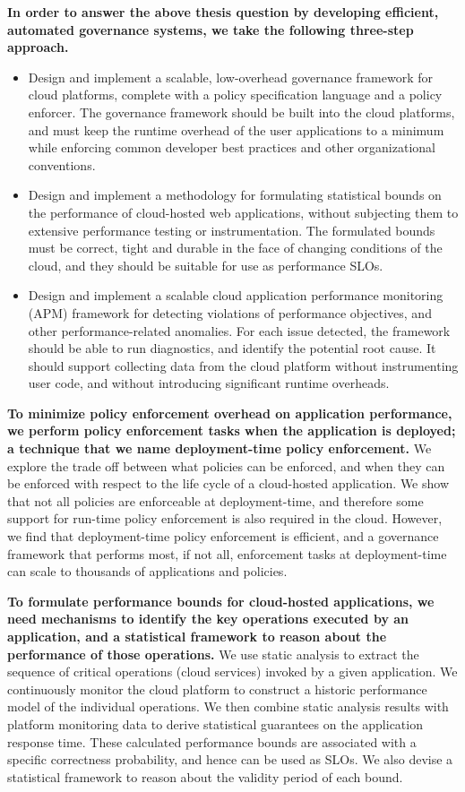 \textbf{In order to answer the above thesis question by developing efficient, automated governance systems,
we take the following three-step approach.}
\begin{itemize}
\item Design and implement a scalable, low-overhead governance framework for cloud platforms,
complete with a policy specification language and a policy enforcer. The governance framework should be
built into the cloud platforms, and must
keep the runtime overhead of the user applications to a minimum while enforcing
common developer best practices and other organizational conventions.
\item Design and implement a methodology for formulating statistical bounds on the
performance of cloud-hosted web applications, without
 subjecting them to extensive performance testing or instrumentation. The formulated
bounds must be correct, tight and durable in the face of changing
 conditions of the cloud, and they should be suitable for use as performance SLOs.
 \item Design and implement a scalable cloud application performance monitoring (APM) framework for detecting
violations of performance objectives, and other performance-related anomalies. For each
issue detected, the framework should be able to run diagnostics, and identify the potential
root cause. It should support collecting data from the cloud platform
 without instrumenting user code, and without introducing significant runtime overheads.
\end{itemize}

\textbf{To minimize policy enforcement overhead on application performance,
we perform policy enforcement tasks when the application is deployed; a technique that we
name deployment-time policy enforcement.} 
We explore the
trade off between what policies can be enforced, and when they can be enforced with respect
to the life cycle of a cloud-hosted application. 
We show that not all policies
are enforceable at deployment-time, and therefore some support for run-time policy enforcement
is also required in the cloud. However, we find that
deployment-time policy enforcement is efficient, and a governance framework that
performs most, if not all, enforcement tasks at deployment-time can scale
to thousands of applications and policies.

\textbf{To formulate performance bounds for cloud-hosted applications,
we need mechanisms to identify the key operations executed by an application, and a
statistical framework to reason about the performance of those operations.} We use static
analysis to extract the sequence of critical operations (cloud services) invoked by a given application.
We continuously monitor the cloud platform to construct a historic performance model of the individual operations.
We then combine static analysis results with platform monitoring data to
derive statistical guarantees on the application response time. These calculated performance
bounds are associated with a specific correctness probability, and hence can be used
as SLOs. We also devise a statistical framework to reason about the validity period of each bound.

